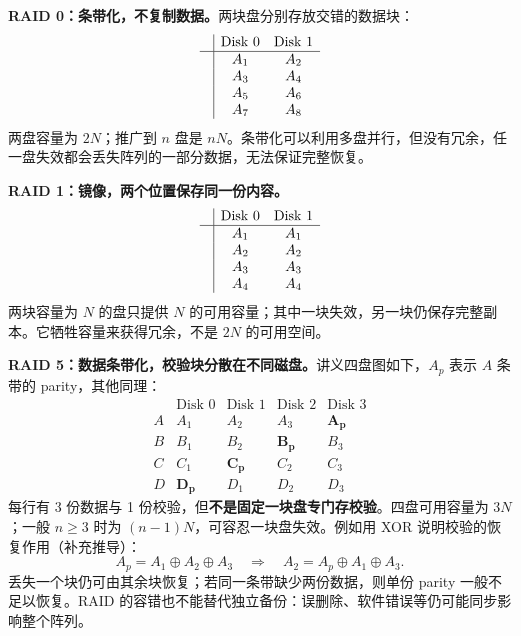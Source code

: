 \begin{checkedsolution}
\textbf{RAID 0：条带化，不复制数据。}两块盘分别存放交错的数据块：
\[
\begin{array}{c|cc}
 & \text{Disk 0} & \text{Disk 1} \\\hline
 & A_1 & A_2\\
 & A_3 & A_4\\
 & A_5 & A_6\\
 & A_7 & A_8
\end{array}
\]
两盘容量为 $2N$；推广到 $n$ 盘是 $nN$。条带化可以利用多盘并行，但没有冗余，任一盘失效都会丢失阵列的一部分数据，无法保证完整恢复。

\textbf{RAID 1：镜像，两个位置保存同一份内容。}
\[
\begin{array}{c|cc}
 & \text{Disk 0} & \text{Disk 1} \\\hline
 & A_1 & A_1\\
 & A_2 & A_2\\
 & A_3 & A_3\\
 & A_4 & A_4
\end{array}
\]
两块容量为 $N$ 的盘只提供 $N$ 的可用容量；其中一块失效，另一块仍保存完整副本。它牺牲容量来获得冗余，不是 $2N$ 的可用空间。

\textbf{RAID 5：数据条带化，校验块分散在不同磁盘。}讲义四盘图如下，$A_p$ 表示 $A$ 条带的 parity，其他同理：
\[
\begin{array}{c|cccc}
 & \text{Disk 0} & \text{Disk 1} & \text{Disk 2} & \text{Disk 3} \\\hline
 A & A_1 & A_2 & A_3 & \mathbf{A_p}\\
 B & B_1 & B_2 & \mathbf{B_p} & B_3\\
 C & C_1 & \mathbf{C_p} & C_2 & C_3\\
 D & \mathbf{D_p} & D_1 & D_2 & D_3
\end{array}
\]
每行有 3 份数据与 1 份校验，但\textbf{不是固定一块盘专门存校验}。四盘可用容量为 $3N$；一般 $n\ge3$ 时为 $(n-1)N$，可容忍一块盘失效。例如用 XOR 说明校验的恢复作用（补充推导）：
\[
 A_p=A_1\oplus A_2\oplus A_3
 \quad\Longrightarrow\quad
 A_2=A_p\oplus A_1\oplus A_3.
\]
丢失一个块仍可由其余块恢复；若同一条带缺少两份数据，则单份 parity 一般不足以恢复。RAID 的容错也不能替代独立备份：误删除、软件错误等仍可能同步影响整个阵列。
\end{checkedsolution}
